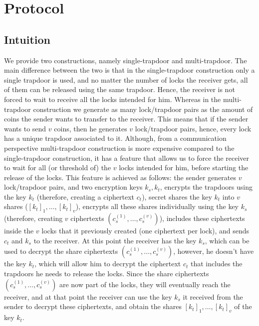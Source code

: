 \section{Protocol}


\subsection{Intuition}

We provide two constructions, namely single-trapdoor and multi-trapdoor. The main difference between the 
two is that in the single-trapdoor construction only a single trapdoor is used, and no matter the number of 
locks the receiver gets, all of them can be released using the same trapdoor. Hence, the receiver is not 
forced to wait to receive all the locks intended for him. Whereas in the multi-trapdoor construction we 
generate as many lock/trapdoor pairs as the amount of coins the sender wants to transfer to the receiver. 
This means that if the sender wants to send $v$ coins, then he generates $v$ lock/trapdoor pairs, hence, 
every lock has a unique trapdoor associated to it. Although, from a communication perspective multi-trapdoor 
construction is more expensive compared to the single-trapdoor construction, it has a feature that allows us 
to force the receiver to wait for all (or threshold of) the $v$ locks intended for him, before starting the 
release of the locks. This feature is achieved as follows: the sender generates $v$ lock/trapdoor pairs, and
two encryption keys $k_s, k_t$, encrypts the trapdoors using the key $k_t$ (therefore, creating a ciphertext 
$c_t$), secret shares the key $k_t$ into $v$ shares ($[k_t]_1,\ldots,[k_t]_v$), 
encrypts all these shares individually using the key $k_s$ (therefore, creating $v$ ciphertexts $(c_s^{(1)},
\ldots,c_s^{(v)})$), includes these ciphertexts inside the $v$ locks that it previously created (one 
ciphertext per lock), and sends $c_t$ and $k_s$ to the receiver. At this point the receiver has the key $k_s$, 
which can be used to decrypt the share ciphertexts $(c_s^{(1)},\ldots,c_s^{(v)})$, however, he doesn't have 
the key $k_t$, which will allow him to decrypt the ciphertext $c_t$ that includes the trapdoors he needs 
to release the locks. Since the share ciphertexts $(c_s^{(1)},\ldots,c_s^{(v)})$ are now part of the locks, 
they will eventually reach the receiver, and at that point the receiver can use the key $k_s$ it received 
from the sender to decrypt these ciphertexts, and obtain the shares $[k_t]_1,\ldots,[k_t]_v$ of the key $k_t$. 
